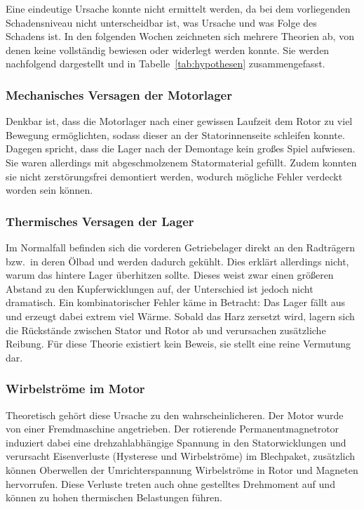 Eine eindeutige Ursache konnte nicht ermittelt werden, da bei dem vorliegenden Schadensniveau nicht unterscheidbar ist, was Ursache und was Folge des Schadens ist. In den folgenden Wochen zeichneten sich mehrere Theorien ab, von denen keine vollständig bewiesen oder widerlegt werden konnte. Sie werden nachfolgend dargestellt und in Tabelle~\ref{tab:hypothesen} zusammengefasst.

\subsubsection{Mechanisches Versagen der Motorlager}
\label{subsec:hyp_lager_mech}

Denkbar ist, dass die Motorlager nach einer gewissen Laufzeit dem Rotor zu viel Bewegung ermöglichten, sodass dieser an der Statorinnenseite schleifen konnte. Dagegen spricht, dass die Lager nach der Demontage kein großes Spiel aufwiesen. Sie waren allerdings mit abgeschmolzenem Statormaterial gefüllt. Zudem konnten sie nicht zerstörungsfrei demontiert werden, wodurch mögliche Fehler verdeckt worden sein können.

\subsubsection{Thermisches Versagen der Lager}
\label{subsec:hyp_lager_therm}

Im Normalfall befinden sich die vorderen Getriebelager direkt an den Radträgern bzw.\ in deren Ölbad und werden dadurch gekühlt. Dies erklärt allerdings nicht, warum das hintere Lager überhitzen sollte. Dieses weist zwar einen größeren Abstand zu den Kupferwicklungen auf, der Unterschied ist jedoch nicht dramatisch. Ein kombinatorischer Fehler käme in Betracht: Das Lager fällt aus und erzeugt dabei extrem viel Wärme. Sobald das Harz zersetzt wird, lagern sich die Rückstände zwischen Stator und Rotor ab und verursachen zusätzliche Reibung. Für diese Theorie existiert kein Beweis, sie stellt eine reine Vermutung dar.

\subsubsection{Wirbelströme im Motor}
\label{subsec:hyp_wirbelstroeme}

Theoretisch gehört diese Ursache zu den wahrscheinlicheren. Der Motor wurde von einer Fremdmaschine angetrieben. Der rotierende Permanentmagnetrotor induziert dabei eine drehzahlabhängige Spannung in den Statorwicklungen und verursacht Eisenverluste (Hysterese und Wirbelströme) im Blechpaket, zusätzlich können Oberwellen der Umrichterspannung Wirbelströme in Rotor und Magneten hervorrufen. Diese Verluste treten auch ohne gestelltes Drehmoment auf und können zu hohen thermischen Belastungen führen.

